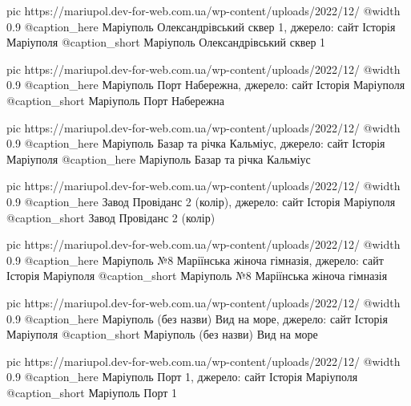   pic https://mariupol.dev-for-web.com.ua/wp-content/uploads/2022/12/%
  @width 0.9
  @caption_here Маріуполь Олександрівський сквер 1, джерело: сайт Історія Маріуполя
  @caption_short Маріуполь Олександрівський сквер 1

  pic https://mariupol.dev-for-web.com.ua/wp-content/uploads/2022/12/%
  @width 0.9
  @caption_here Маріуполь Порт Набережна, джерело: сайт Історія Маріуполя
  @caption_short Маріуполь Порт Набережна

  pic https://mariupol.dev-for-web.com.ua/wp-content/uploads/2022/12/%
  @width 0.9
  @caption_here Маріуполь Базар та річка Кальміус, джерело: сайт Історія Маріуполя
  @caption_here Маріуполь Базар та річка Кальміус

  pic https://mariupol.dev-for-web.com.ua/wp-content/uploads/2022/12/%
  @width 0.9
  @caption_here Завод Провіданс 2 (колір), джерело: сайт Історія Маріуполя
  @caption_short Завод Провіданс 2 (колір)

  pic https://mariupol.dev-for-web.com.ua/wp-content/uploads/2022/12/%
  @width 0.9
  @caption_here Маріуполь №8 Маріїнська жіноча гімназія, джерело: сайт Історія Маріуполя
  @caption_short Маріуполь №8 Маріїнська жіноча гімназія

  pic https://mariupol.dev-for-web.com.ua/wp-content/uploads/2022/12/%
  @width 0.9
  @caption_here Маріуполь (без назви) Вид на море, джерело: сайт Історія Маріуполя
  @caption_short Маріуполь (без назви) Вид на море

  pic https://mariupol.dev-for-web.com.ua/wp-content/uploads/2022/12/%
  @width 0.9
  @caption_here Маріуполь Порт 1, джерело: сайт Історія Маріуполя
  @caption_short Маріуполь Порт 1

